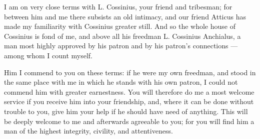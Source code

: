 

 I am on very close terms with L. Cossinius, your friend and tribesman; for between him and me there subsists an old intimacy, and our friend Atticus has made my familiarity with Cossinius greater still. And so the whole house of Cossinius is fond of me, and above all his freedman L. Cossinius Anchialus, a man most highly approved by his patron and by his patron's connections --- among whom I count myself.

 Him I commend to you on these terms: if he were my own freedman, and stood in the same place with me in which he stands with his own patron, I could not commend him with greater earnestness. You will therefore do me a most welcome service if you receive him into your friendship, and, where it can be done without trouble to you, give him your help if he should have need of anything. This will be deeply welcome to me and afterwards agreeable to you; for you will find him a man of the highest integrity, civility, and attentiveness.

